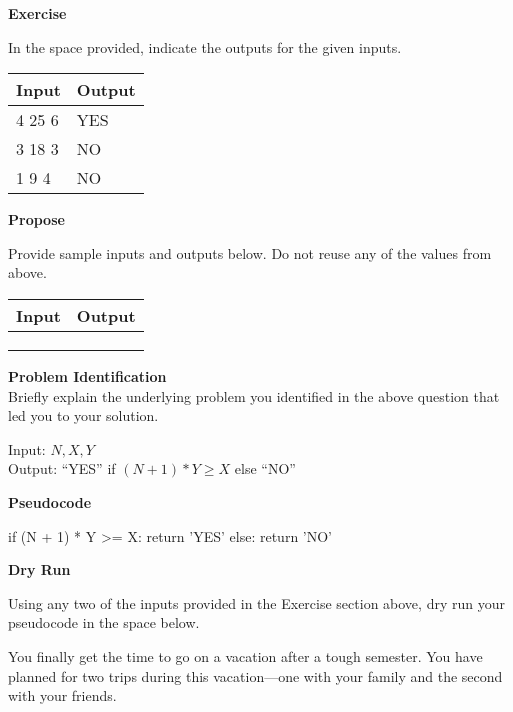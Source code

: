 \documentclass[a4paper]{exam}
\newcommand\heading[1]{\textbf{#1}}
\begin{document}
\begin{questions}
    \heading{Exercise}

    In the space provided, indicate the outputs for the given inputs.

    \begin{tabularx}{\textwidth}{|X|X|}
        \rowcolor{gray!50}
        \hline
        Input  & Output \\ \hline\hline
        4 25 6 & YES    \\\hline
        3 18 3 & NO     \\\hline
        1 9 4  & NO     \\\hline
    \end{tabularx}

    \heading{Propose}

    Provide sample inputs and outputs below. Do not reuse any of the values from above.

    \begin{tabularx}{\textwidth}{|X|X|}
        \rowcolor{gray!50}
        \hline
        Input & Output \\ \hline\hline
              &        \\\hline
              &        \\\hline
              &        \\\hline
    \end{tabularx}
    \heading{Problem Identification}\\
    Briefly explain the underlying problem you identified in the above question that led you to your solution.

  \begin{mdframed}
    Input: $N,X,Y$\\
    Output: ``YES'' if $(N+1)*Y\geq X$ else ``NO''
  \end{mdframed}
  
    \heading{Pseudocode}
\begin{python}
if (N + 1) * Y >= X:
    return 'YES'
else:
    return 'NO'
\end{python}
    
    \heading{Dry Run}
    
    Using any two of the inputs provided in the Exercise section above, dry run your pseudocode in the space below.
    \vspace*{100pt}



      You finally get the time to go on a vacation after a tough semester. You have planned for two trips during this vacation---one with your family and the second with your friends.
      

\end{questions}
\end{document}
